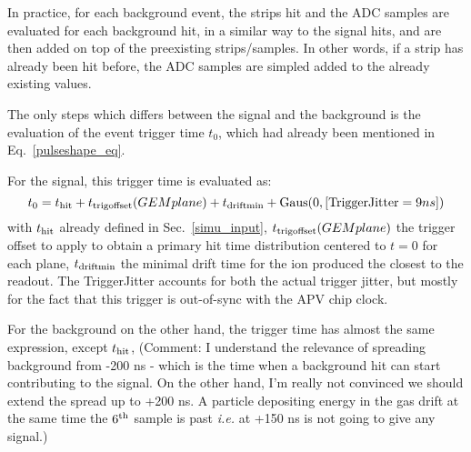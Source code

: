 In practice, for each background event, the strips hit and the ADC samples are evaluated for each background hit, in a similar way to the signal hits, and are then added on top of the preexisting strips/samples.
In other words, if a strip has already been hit before, the ADC samples are simpled added to the already existing values.

The only steps which differs between the signal and the background is the evaluation 
of the event trigger time $t_0$, which had already been mentioned in Eq.~\ref{pulseshape_eq}.

For the signal, this trigger time is evaluated as:
%
\begin{equation}
  t_0 = t_{\rm hit} + t_{\rm trig offset}(GEM plane) + t_{\rm drift min} + {\rm Gaus}(0, [{\rm TriggerJitter} = 9 ns])
\end{equation}
%
with $t_{\rm hit}$ already defined in Sec.~\ref{simu_input}, $t_{\rm trig offset}(GEM plane)$ the trigger offset to apply to obtain a primary hit time distribution centered to $t = 0$ for each plane, $t_{\rm drift min}$ the minimal drift time for the ion produced the closest to the readout.
The TriggerJitter accounts for both the actual trigger jitter, but mostly for the fact that this trigger is out-of-sync with the APV chip clock.

For the background on the other hand, the trigger time has almost the same expression, except $t_{\rm hit}$, %
%
%
(Comment: I understand the relevance of spreading background from -200 ns - which is the time when a background hit can start contributing to the signal. On the other hand, I'm really not convinced we should extend the spread up to +200 ns. A particle depositing energy in the gas drift at the same time the $6^{\rm th}$ sample is past {\it i.e.} at +150 ns is not going to give any signal.)


%
%
%
%

